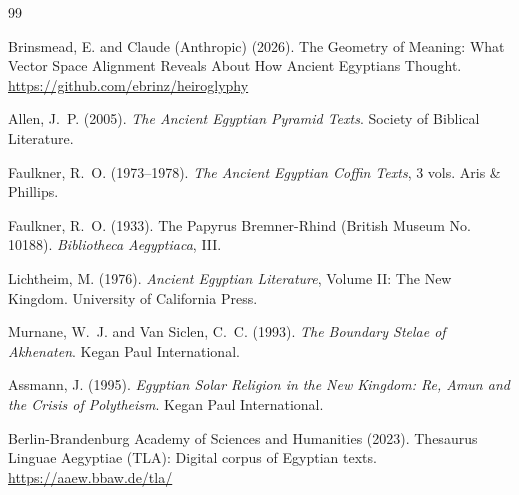 \documentclass[11pt, a4paper]{article}
\begin{document}

\begin{thebibliography}{99}

Brinsmead, E. and Claude (Anthropic) (2026).
\newblock The Geometry of Meaning: What Vector Space Alignment Reveals About How Ancient Egyptians Thought.
\newblock \url{https://github.com/ebrinz/heiroglyphy}

Allen, J.~P. (2005).
\newblock \textit{The Ancient Egyptian Pyramid Texts}.
\newblock Society of Biblical Literature.

Faulkner, R.~O. (1973--1978).
\newblock \textit{The Ancient Egyptian Coffin Texts}, 3 vols.
\newblock Aris \& Phillips.

Faulkner, R.~O. (1933).
\newblock The Papyrus Bremner-Rhind (British Museum No. 10188).
\newblock \textit{Bibliotheca Aegyptiaca}, III.

Lichtheim, M. (1976).
\newblock \textit{Ancient Egyptian Literature}, Volume II: The New Kingdom.
\newblock University of California Press.

Murnane, W.~J. and Van Siclen, C.~C. (1993).
\newblock \textit{The Boundary Stelae of Akhenaten}.
\newblock Kegan Paul International.

Assmann, J. (1995).
\newblock \textit{Egyptian Solar Religion in the New Kingdom: Re, Amun and the Crisis of Polytheism}.
\newblock Kegan Paul International.

Berlin-Brandenburg Academy of Sciences and Humanities (2023).
\newblock Thesaurus Linguae Aegyptiae (TLA): Digital corpus of Egyptian texts.
\newblock \url{https://aaew.bbaw.de/tla/}

\end{thebibliography}
\end{document}

